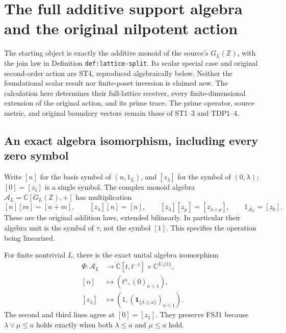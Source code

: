 \documentclass[11pt]{article}
\begin{document}
\section{The full additive support algebra and the original nilpotent action}
\label{sec:full-support-jet}

The starting object is exactly the additive monoid of the source's
$G_L(\mathbb Z)$, with the join law in Definition
\texttt{def:lattice-split}. Its scalar special case and original
second-order action are ST4, reproduced algebraically below. Neither
the foundational scalar result nor finite-poset inversion is claimed
new. The calculation here determines their full-lattice receiver,
every finite-dimensional extension of the original action, and its
prime trace. The prime operator, source metric, and original boundary
vectors remain those of ST1--3 and TDP1--4.

\subsection{An exact algebra isomorphism, including every zero symbol}
Write $[n]$ for the basis symbol of $(n,1_L)$, and $[z_\lambda]$
for the symbol of $(0,\lambda)$; $[0]=[z_1]$ is a single symbol.
The complex monoid algebra $\mathcal A_L=\mathbb C[G_L(\mathbb Z),+]$
has multiplication
\[
[n][m]=[n+m],\qquad [z_\lambda][n]=[n],\qquad
[z_\lambda][z_\mu]=[z_{\lambda\vee\mu}],\qquad
1_{\mathcal A_L}=[z_0].
\tag{FSJ1}
\]
These are the original addition laws, extended bilinearly. In
particular their algebra unit is the symbol of $\tau$, not the
symbol $[1]$. This specifies the operation being linearized.

For finite nontrivial $L$, there is the exact unital algebra isomorphism
\[
\begin{split}
\Psi:\mathcal A_L&\longrightarrow
 \mathbb C[t,t^{-1}]\times\mathbb C^{L\setminus\{1\}},\\
[n]&\longmapsto(t^n,(0)_{a<1}),\\
[z_\lambda]&\longmapsto(1,(\mathbf1_{\{\lambda\le a\}})_{a<1}).
\end{split}
\tag{FSJ2}
\]
The second and third lines agree at $[0]=[z_1]$. They preserve
FSJ1 because $\lambda\vee\mu\le a$ holds exactly when both
$\lambda\le a$ and $\mu\le a$ hold.
\end{document}
